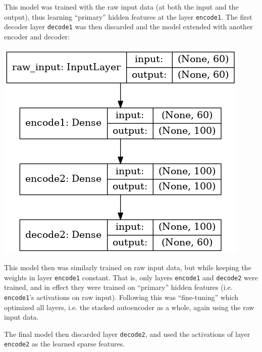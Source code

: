 \documentclass[journal]{IEEEtran}
\begin{document}
This model was trained with the raw input data (at both the input and
the output), thus learning ``primary'' hidden features at the layer
\texttt{encode1}.  The first decoder layer \texttt{decode1} was then
discarded and the model extended with another encoder and decoder:

\includegraphics[width=0.7\linewidth]{keras_autoencoder2.png}

This model then was similarly trained on raw input data, but while
keeping the weights in layer \texttt{encode1} constant.  That is, only
layers \texttt{encode1} and \texttt{decode2} were trained, and in
effect they were trained on ``primary'' hidden features
(i.e. \texttt{encode1}'s activations on raw input).  Following this
was ``fine-tuning''\cite{Ng} which optimized all layers, i.e. the
stacked autoencoder as a whole, again using the raw input data.

The final model then discarded layer \texttt{decode2}, and used the
activations of layer \texttt{encode2} as the learned sparse features.



\end{document}
